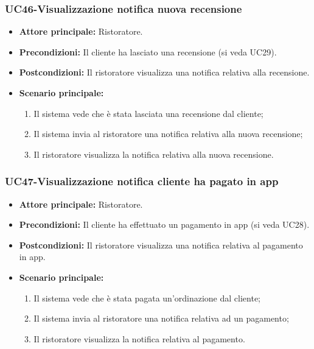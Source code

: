 \subsubsection{UC46-Visualizzazione notifica nuova recensione}
\begin{itemize}
\item \textbf{Attore principale:} Ristoratore.
\item \textbf{Precondizioni:} Il cliente ha lasciato una recensione (si veda UC29).
\item \textbf{Postcondizioni:} Il ristoratore visualizza una notifica relativa alla recensione.
\item \textbf{Scenario principale:}
\begin{enumerate}
    \item Il sistema vede che è stata lasciata una recensione dal cliente;
    \item Il sistema invia al ristoratore una notifica relativa alla nuova recensione;
    \item Il ristoratore visualizza la notifica relativa alla nuova recensione.
\end{enumerate}
\end{itemize}

\subsubsection{UC47-Visualizzazione notifica cliente ha pagato in app}
\begin{itemize}
\item \textbf{Attore principale:} Ristoratore.
\item \textbf{Precondizioni:} Il cliente ha effettuato un pagamento in app (si veda UC28).
\item \textbf{Postcondizioni:} Il ristoratore visualizza una notifica relativa al pagamento in app.
\item \textbf{Scenario principale:}
\begin{enumerate}
    \item Il sistema vede che è stata pagata un'ordinazione dal cliente;
    \item Il sistema invia al ristoratore una notifica relativa ad un pagamento;
    \item Il ristoratore visualizza la notifica relativa al pagamento.
\end{enumerate}
\end{itemize}

